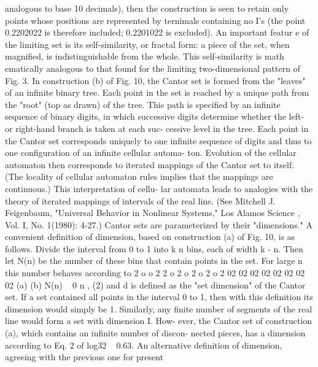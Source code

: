 analogous to base 10 decimals), then the
construction is seen to retain only points
whose positions are represented by ternimals
containing no I's (the point 0.2202022 is
therefore included; 0.2201022 is excluded).
An important featur e of the limiting set is its
self-similarity, or fractal form: a piece of the
set, when magnified, is indistinguishable
from the whole. This self-similarity is math
ematically analogous to that found for the
limiting two-dimensional pattern of Fig. 3.
In construction (b) of Fig. 10, the Cantor
set is formed from the "leaves" of an infinite
binary tree. Each point in the set is reached
by a unique path from the "root" (top as
drawn) of the tree. This path is specified by
an infinite sequence of binary digits, in which
successive digits determine whether the left-
or right-hand branch is taken at each suc-
cessive level in the tree. Each point in the
Cantor set corresponds uniquely to one
infinite sequence of digits and thus to one
configuration of an infinite cellular automa-
ton. Evolution of the cellular automaton then
corresponds to iterated mappings of the
Cantor set to itself. (The locality of cellular
automaton rules implies that the mappings
are continuous.) This interpretation of cellu-
lar automata leads to analogies with the
theory of iterated mappings of intervals of
the real line. (See Mitchell J. Feigenbaum,
"Universal Behavior in Nonlinear Systems,"
Los Alamos Science , Vol. I, No. 1(1980):
4-27.)
Cantor sets are parameterized by their
"dimensions." A convenient definition of
dimension, based on construction (a) of Fig.
10, is as follows. Divide the interval from 0
to 1 into k n bins, each of width k - n. Then let
N(n) be the number of these bins that
contain points in the set. For large n this
number behaves according to
2
o
o
2
2
o 2 o 2 o 2 o 2
02 02 02 02 02 02 02 02
(a)
(b)
N(n) ~
0
n ,
(2)
and d is defined as the "set dimension" of the
Cantor set. If a set contained all points in the
interval 0 to 1, then with this definition its
dimension would simply be 1. Similarly, any
finite number of segments of the real line
would form a set with dimension I. How-
ever, the Cantor set of construction (a),
which contains an infinite number of discon-
nected pieces, has a dimension according to
Eq. 2 of log32 ~ 0.63.
An alternative definition of dimension,
agreeing with the previous one for present

